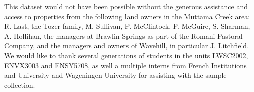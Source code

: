 \documentclass[, manuscript]{copernicus}
\begin{document}



\begin{acknowledgements}
This dataset would not have been possible without the generous
assistance and access to properties from the following land owners in
the Muttama Creek area: R. Last, the Tozer family, M. Sullivan, P.
McClintock, P. McGuire, S. Sharman, A. Hollihan, the managers at Brawlin
Springs as part of the Romani Pastoral Company, and the managers and
owners of Wavehill, in particular J. Litchfield. We would like to thank
several generations of students in the units LWSC2002, ENVX3003 and
ENSY5708, as well a multiple interns from French Institutions and
University and Wageningen University for assisting with the sample
collection.
\end{acknowledgements}







\end{document}

